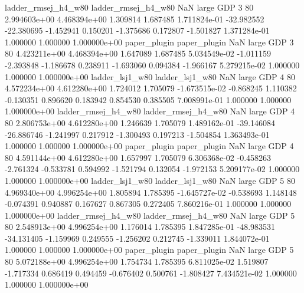 ladder_rmsej_h4_w80 ladder_rmsej_h4_w80                   NaN      large      GDP                 3 80 2.994603e+00   4.468394e+00      1.309814       1.687485  1.711824e-01    -32.982552    -22.380695    -1.452941       0.150201 -1.375686   0.172807    -1.501827   1.371284e-01            1.000000        1.000000        1.000000e+00
       paper_plugin        paper_plugin                   NaN      large      GDP                 3 80 4.423211e+00   4.468394e+00      1.647089       1.687485  5.034549e-02     -1.011159     -2.393848    -1.186678       0.238911 -1.693060   0.094384    -1.966167   5.279215e-02            1.000000        1.000000        1.000000e+00
    ladder_lsj1_w80     ladder_lsj1_w80                   NaN      large      GDP                 4 80 4.572234e+00   4.612280e+00      1.724012       1.705079 -1.673515e-02     -0.868245      1.110382    -0.130351       0.896620  0.183942   0.854530     0.385505   7.008991e-01            1.000000        1.000000        1.000000e+00
ladder_rmsej_h4_w80 ladder_rmsej_h4_w80                   NaN      large      GDP                 4 80 2.806753e+00   4.612280e+00      1.246639       1.705079  1.489162e-01    -39.146084    -26.886746    -1.241997       0.217912 -1.300493   0.197213    -1.504854   1.363493e-01            1.000000        1.000000        1.000000e+00
       paper_plugin        paper_plugin                   NaN      large      GDP                 4 80 4.591144e+00   4.612280e+00      1.657997       1.705079  6.306368e-02     -0.458263     -2.761324    -0.533781       0.594992 -1.521794   0.132054    -1.972153   5.209177e-02            1.000000        1.000000        1.000000e+00
    ladder_lsj1_w80     ladder_lsj1_w80                   NaN      large      GDP                 5 80 4.969340e+00   4.996254e+00      1.805894       1.785395 -1.645727e-02     -0.538693      1.148148    -0.074391       0.940887  0.167627   0.867305     0.272405   7.860216e-01            1.000000        1.000000        1.000000e+00
ladder_rmsej_h4_w80 ladder_rmsej_h4_w80                   NaN      large      GDP                 5 80 2.548913e+00   4.996254e+00      1.176014       1.785395  1.847285e-01    -48.983531    -34.131405    -1.159969       0.249555 -1.256202   0.212745    -1.339011   1.844072e-01            1.000000        1.000000        1.000000e+00
       paper_plugin        paper_plugin                   NaN      large      GDP                 5 80 5.072188e+00   4.996254e+00      1.754734       1.785395  6.811025e-02      1.519807     -1.717334     0.686419       0.494459 -0.676402   0.500761    -1.808427   7.434521e-02            1.000000        1.000000        1.000000e+00

